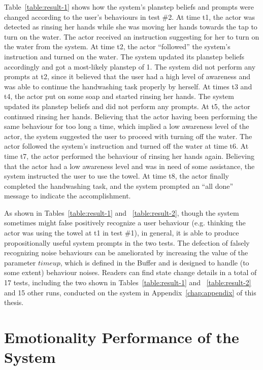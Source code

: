 Table~\ref{table:result-1} shows how the system's planstep beliefs and prompts were changed according to the user's behaviours in test \#2. At time t1, the actor was detected as rinsing her hands while she was moving her hands towards the tap to turn on the water. The actor received an instruction suggesting for her to turn on the water from the system. At time t2, the actor ``followed'' the system's instruction and turned on the water. The system updated its planstep beliefs accordingly and got a most-likely planstep of 1. The system did not perform any prompts at t2, since it believed that the user had a high level of awareness and was able to continue the handwashing task properly by herself. At times t3 and t4, the actor put on some soap and started rinsing her hands. The system updated its planstep beliefs and did not perform any prompts. At t5, the actor continued rinsing her hands. Believing that the actor having been performing the same behaviour for too long a time, which implied a low awareness level of the actor, the system suggested the user to proceed with turning off the water. The actor followed the system's instruction and turned off the water at time t6. At time t7, the actor performed the behaviour of rinsing her hands again. Believing that the actor had a low awareness level and was in need of some assistance, the system instructed the user to use the towel. At time t8, the actor finally completed the handwashing task, and the system prompted an ``all done'' message to indicate the accomplishment. 

As shown in Tables~\ref{table:result-1} and ~\ref{table:result-2}, though the system sometimes might false positively recognize a user behaviour (e.g. thinking the actor was using the towel at t1 in test \#1), in general, it is able to produce propositionally useful system prompts in the two tests. The defection of falsely recognizing noise behaviours can be ameliorated by increasing the value of the parameter $timeup$, which is defined in the Buffer and is designed to handle (to some extent) behaviour noises. Readers can find state change details in a total of 17 tests, including the two shown in Tables~\ref{table:result-1} and ~\ref{table:result-2} and 15 other runs, conducted on the system in Appendix~\ref{chap:appendix} of this thesis.


\section{Emotionality Performance of the System}

